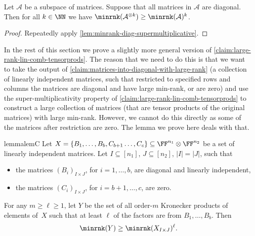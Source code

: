 \begin{lemma}\label{claim:large-rank-lin-comb-tensorprods}
    Let $\mathcal{A}$ %
    be a subspace of matrices. Suppose that all matrices in $\mathcal{A}$ are diagonal. %
    Then for all $k\in\NN$ we have $\minrnk(\mathcal{A}^{\otimes k})\geq \minrnk(\mathcal{A})^k$.
\end{lemma}
\begin{proof}
    Repeatedly apply \autoref{lem:minrank-diag-supermultiplicative}.
\end{proof}
%
%

%

%

%
In the rest of this section we prove a slightly more general version of \autoref{claim:large-rank-lin-comb-tensorprods}.
The reason that we need to do this is that we want to take the output of \autoref{claim:matrices-into-diagonal-with-large-rank} (a collection of linearly independent matrices, such that restricted to specified rows and columns the matrices are diagonal and have large min-rank, or are zero) and use the super-multiplicativity property of \autoref{claim:large-rank-lin-comb-tensorprods} to construct a large collection of matrices (that are tensor products of the original matrices) with large min-rank. However, we cannot do this directly as some of the matrices after restriction are zero. The lemma we prove here deals with that.



%
%

%
\begin{restatable}{lemma}{lemC}
%
\label{claim:linear-combinations-of-mixed-tensorprods-high-rank}
    Let $X = \{B_1, \ldots, B_b, C_{b+1} \ldots, C_c\} \subseteq \FF^{n_1} \otimes \FF^{n_2}$ be a set of linearly independent matrices. Let $I\subseteq [n_1]$, $J \subseteq [n_2]$, $|I|=|J|$, such that 
    \begin{itemize}
        \item the matrices $(B_i)_{I\times J}$, for $i = 1, \ldots, b$, are diagonal and linearly independent,
        \item the matrices $(C_i)_{I\times J}$, for $i = b+1, \ldots, c$, are zero.
    \end{itemize}
    For any $m \geq \ell\geq 1$, 
    let $Y$ %
    be the set of all order-$m$ Kronecker products of elements of~$X$ such that at least $\ell$ of the factors are from $B_1, \ldots, B_b$. Then %
    \[
    \minrnk(Y) \geq \minrnk(X_{I\times J})^{\ell}.
    \]
%
\end{restatable}
 
